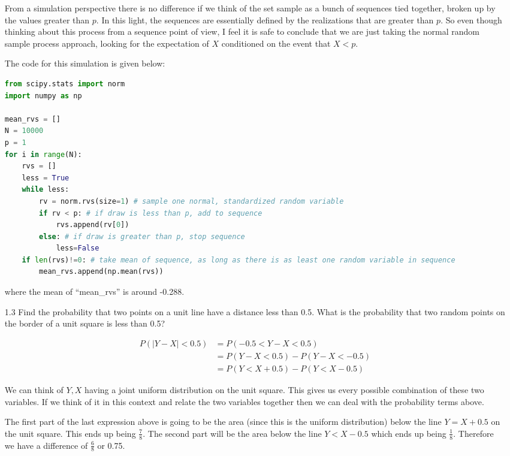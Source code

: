 \begin{enumerate}
From a simulation perspective there is no difference if we think of the set sample as a bunch of sequences tied together, broken up by the values greater than $p$. In this light, the sequences are essentially defined by the realizations that are greater than $p$. So even though thinking about this process from a sequence point of view, I feel it is safe to conclude that we are just taking the normal random sample process approach, looking for the expectation of $X$ conditioned on the event that $X<p$. 

The code for this simulation is given below:

\begin{lstlisting}[language=Python]
from scipy.stats import norm
import numpy as np

mean_rvs = []
N = 10000
p = 1
for i in range(N):
    rvs = []
    less = True
    while less:
        rv = norm.rvs(size=1) # sample one normal, standardized random variable
        if rv < p: # if draw is less than p, add to sequence
            rvs.append(rv[0])
        else: # if draw is greater than p, stop sequence
            less=False
    if len(rvs)!=0: # take mean of sequence, as long as there is as least one random variable in sequence
        mean_rvs.append(np.mean(rvs))
\end{lstlisting}
\noindent where the mean of ``mean\_rvs'' is around -0.288.


\item[1.3] Find the probability that two points on a unit line have a distance less than 0.5. What is the probability that two random points on the border of a unit square is less than 0.5?


\begin{equation}
\begin{split}
P(|Y-X| < 0.5) &= P(-0.5 < Y-X < 0.5) \\
&= P(Y-X < 0.5) - P(Y-X < -0.5) \\
&= P(Y < X + 0.5) - P(Y < X - 0.5)
\end{split}
\end{equation}

We can think of $Y, X$ having a joint uniform distribution on the unit square. This gives us every possible combination of these two variables. If we think of it in this context and relate the two variables together then we can deal with the probability terms above. 

The first part of the last expression above is going to be the area (since this is the uniform distribution) below the line $Y = X + 0.5$ on the unit square. This ends up being $\frac{7}{8}$. The second part will be the area below the line $Y < X - 0.5$ which ends up being $\frac{1}{8}$. Therefore we have a difference of $\frac{6}{8}$ or 0.75. 


\end{enumerate}
